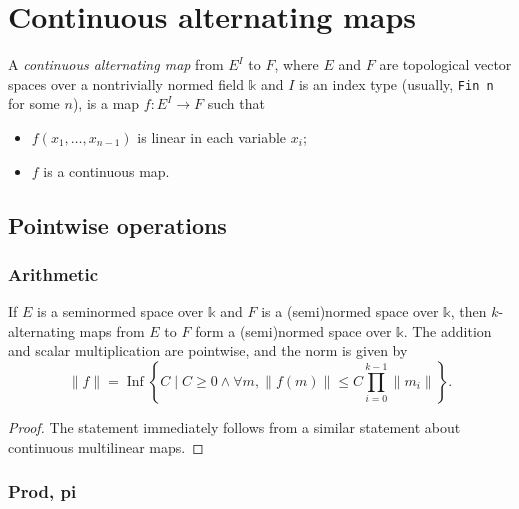 \chapter{Continuous alternating maps}

\begin{definition}%
  \label{def:cont-alt-map}
  \leanok%
  A \emph{continuous alternating map} from \(E^{I}\) to \(F\),
  where \(E\) and \(F\) are topological vector spaces
  over a nontrivially normed field \(\mathbb k\)
  and \(I\) is an index type (usually, \texttt{Fin n} for some \(n\)),
  is a map \(f\colon E^{I} \to F\) such that
  \begin{itemize}
  \item \(f(x_{1}, \dots, x_{n - 1})\) is linear in each variable \(x_{i}\);
  \item \(f\) is a continuous map.
  \end{itemize}
\end{definition}

\section{Pointwise operations}%
\label{sec:pointwise-operations}

\subsection{Arithmetic}%
\label{sec:arithmetic}

\begin{theorem}%
  \label{thm:normed-grp}
  If \(E\) is a seminormed space over \(\mathbb k\) and \(F\) is a (semi)normed space over \(\mathbb k\),
  then \(k\)-alternating maps from \(E\) to \(F\) form a (semi)normed space over \(\mathbb k\).
  The addition and scalar multiplication are pointwise, and the norm is given by
  \begin{equation}
    \label{eq:alt-norm}
    \|f\| = \operatorname{Inf} \left\{C \mid C \ge 0 \wedge \forall m, \|f(m)\| \le C\prod_{i=0}^{k-1}\|m_{i}\|\right\}.
  \end{equation}
\end{theorem}
\begin{proof}
  The statement immediately follows from a similar statement about continuous multilinear maps.
\end{proof}

\subsection{Prod, pi}%
\label{sec:prod-pi}

